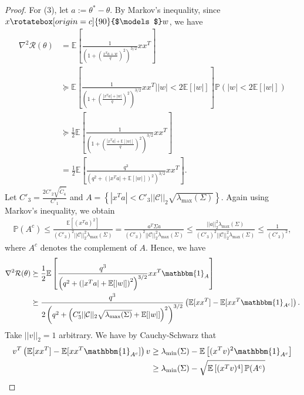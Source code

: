 \documentclass{article}
\newcommand{\indep}{\rotatebox[origin=c]{90}{$\models$}}
\begin{document}
\begin{proof}
For (3), let $a := \theta^* - \theta$. By Markov's inequality, since $x \indep w$, we have
\begin{align*}
\nabla^2\mathcal{R}(\theta) &= \mathbb{E}\left[\frac{1}{\left(1 + \left(\frac{x^Ta + w}{q}\right)^2\right)^{3/2}}xx^T\right] \\
%
& \succeq \mathbb{E}\left[\frac{1}{\left(1 + \left(\frac{|x^Ta| + |w|}{q}\right)^2\right)^{3/2}}xx^T\bigg\rvert|w| < 2\mathbb{E}[|w|]\right]\mathbb{P}(|w| < 2\mathbb{E}[|w|])\\
&\succeq \frac{1}{2}\mathbb{E}\left[\frac{1}{\left(1 + \left(\frac{|x^Ta| + \mathbb{E}[|w|]}{q}\right)^2\right)^{3/2}}xx^T\right]\\ 
&= \frac{1}{2}\mathbb{E}\left[\frac{q^3}{\left(q^2 + \left(|x^Ta| + \mathbb{E}[|w|]\right)^2\right)^{3/2}}xx^T\right].
\end{align*}
Let $C'_3 = \frac{2C'_2\sqrt{\widetilde{C}_4}}{C'_1}$ and $A = \left\{|x^Ta| < C'_3||\mathcal{C}||_2\sqrt{\lambda_{\max}(\Sigma)}\right\}$. Again using Markov's inequality, we obtain
\begin{align*}
\mathbb{P}(A^c) \leq \frac{\mathbb{E}\left[(x^Ta)^2\right]}{(C'_3)^2||\mathcal{C}||_2^2\lambda_{\max}(\Sigma)} = \frac{a^T\Sigma a}{(C'_3)^2||\mathcal{C}||_2^2\lambda_{\max}(\Sigma)} \leq \frac{||a||_2^2\lambda_{\max}(\Sigma)}{(C'_3)^2||\mathcal{C}||_2^2\lambda_{\max}(\Sigma)} \leq \frac{1}{(C'_3)^2},
\end{align*}
where $A^c$ denotes the complement of $A$. Hence, we have
\begin{align*}
\nabla^2\mathcal{R}(\theta) &\succeq \frac{1}{2}\mathbb{E}\left[\frac{q^3}{\left(q^2 + \left(|x^Ta| + \mathbb{E}[|w|]\right)^2\right)^{3/2}}xx^T\mathbbm{1}_A\right]\\
&\succeq \frac{q^3}{2\left(q^2 + \left(C'_3||\mathcal{C}||_2\sqrt{\lambda_{\max}(\Sigma)} + \mathbb{E}[|w|]\right)^2\right)^{3/2}}\left(\mathbb{E}[xx^T] - \mathbb{E}[xx^T\mathbbm{1}_{A^c}]\right).
\end{align*}
Take $||v||_2 = 1$ arbitrary. We have by Cauchy-Schwarz that
\begin{align*}
v^T\left(\mathbb{E}[xx^T] - \mathbb{E}[xx^T\mathbbm{1}_{A^c}]\right)v &\geq \lambda_{\min}(\Sigma) - \mathbb{E}\left[(x^Tv)^2\mathbbm{1}_{A^c}\right]\\
&\geq \lambda_{\min}(\Sigma) - \sqrt{\mathbb{E}\left[(x^Tv)^4\right]\mathbb{P}(A^c)}\\

\end{align*}
\end{proof}
\end{document}
